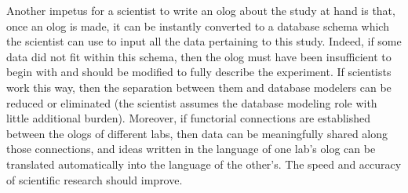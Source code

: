 \documentclass{amsart}
\theoremstyle{remark}
\theoremstyle{definition}
\begin{document}
Another impetus for a scientist to write an olog about the study at hand is that, once an olog is made, it can be instantly converted to a database schema which the scientist can use to input all the data pertaining to this study. Indeed, if some data did not fit within this schema, then the olog must have been insufficient to begin with and should be modified to fully describe the experiment. If scientists work this way, then the separation between them and database modelers can be reduced or eliminated (the scientist assumes the database modeling role with little additional burden). Moreover, if functorial connections are established between the ologs of different labs, then data can be meaningfully shared along those connections, and ideas written in the language of one lab's olog can be translated automatically into the language of the other's. The speed and accuracy of scientific research should improve.

\end{document}
